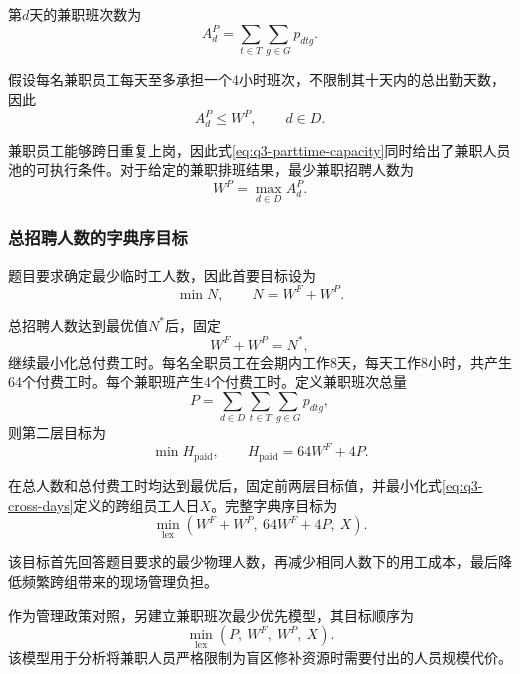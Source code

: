 \documentclass[withoutpreface,bwprint]{cumcmthesis}
\begin{document}
第$d$天的兼职班次数为
\begin{equation}
A_d^P
=
\sum_{t\in T}\sum_{g\in G}p_{dtg}.
\label{eq:q3-parttime-daily}
\end{equation}

假设每名兼职员工每天至多承担一个4小时班次，不限制其十天内的总出勤天数，因此
\begin{equation}
A_d^P\leq W^P,
\qquad d\in D.
\label{eq:q3-parttime-capacity}
\end{equation}

兼职员工能够跨日重复上岗，因此式\eqref{eq:q3-parttime-capacity}同时给出了兼职人员池的可执行条件。对于给定的兼职排班结果，最少兼职招聘人数为
\begin{equation}
W^P
=
\max_{d\in D}A_d^P.
\label{eq:q3-parttime-staff}
\end{equation}

\subsubsection{总招聘人数的字典序目标}

题目要求确定最少临时工人数，因此首要目标设为
\begin{equation}
\min N,
\qquad
N=W^F+W^P.
\label{eq:q3-headcount-objective}
\end{equation}

总招聘人数达到最优值$N^*$后，固定
\[
W^F+W^P=N^*,
\]
继续最小化总付费工时。每名全职员工在会期内工作8天，每天工作8小时，共产生64个付费工时。每个兼职班产生4个付费工时。定义兼职班次总量
\begin{equation}
P
=
\sum_{d\in D}
\sum_{t\in T}
\sum_{g\in G}
p_{dtg},
\label{eq:q3-parttime-shifts}
\end{equation}
则第二层目标为
\begin{equation}
\min H_{\mathrm{paid}},
\qquad
H_{\mathrm{paid}}=64W^F+4P.
\label{eq:q3-paid-hours-objective}
\end{equation}

在总人数和总付费工时均达到最优后，固定前两层目标值，并最小化式\eqref{eq:q3-cross-days}定义的跨组员工人日$X$。完整字典序目标为
\begin{equation}
\min_{\mathrm{lex}}
\left(
W^F+W^P,\ 
64W^F+4P,\ 
X
\right).
\label{eq:q3-lexicographic-objective}
\end{equation}

该目标首先回答题目要求的最少物理人数，再减少相同人数下的用工成本，最后降低频繁跨组带来的现场管理负担。

作为管理政策对照，另建立兼职班次最少优先模型，其目标顺序为
\begin{equation}
\min_{\mathrm{lex}}
\left(
P,\ 
W^F,\ 
W^P,\ 
X
\right).
\label{eq:q3-parttime-first-objective}
\end{equation}
该模型用于分析将兼职人员严格限制为盲区修补资源时需要付出的人员规模代价。
\end{document}
